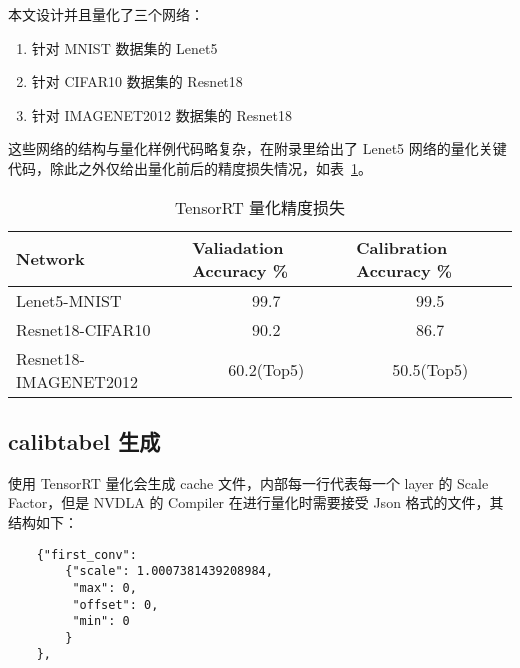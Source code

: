 本文设计并且量化了三个网络：

\begin{enumerate}
    \item 针对 MNIST 数据集的 Lenet5
    \item 针对 CIFAR10 数据集的 Resnet18
    \item 针对 IMAGENET2012 数据集的 Resnet18
\end{enumerate}

这些网络的结构与量化样例代码略复杂，在附录里给出了 Lenet5 网络的量化关键代码，除此之外仅给出量化前后的精度损失情况，如表~\ref{tab:Qualifications Report}。

\begin{table}[!htbp]
    \caption{TensorRT 量化精度损失}
    \label{tab:Qualifications Report}
    \centering
    \footnotesize%
    \setlength{\tabcolsep}{4pt}%
    \renewcommand{\arraystretch}{1.2}%
    \begin{tabular}{lcc}
        \toprule
        \textbf{Network}      & \multicolumn{1}{l}{\textbf{Valiadation Accuracy \%}} & \multicolumn{1}{l}{\textbf{Calibration Accuracy \%}} \\
        \midrule
        Lenet5-MNIST          & 99.7                                                 & 99.5                                                 \\
        Resnet18-CIFAR10      & 90.2                                                 & 86.7                                                 \\
        Resnet18-IMAGENET2012 & 60.2(Top5)                                           & 50.5(Top5)                                           \\
        \bottomrule                   
    \end{tabular}
\end{table}

\subsection{calibtabel 生成}

使用 TensorRT 量化会生成 cache 文件，内部每一行代表每一个 layer 的 Scale Factor，但是 NVDLA 的 Compiler 在进行量化时需要接受 Json 格式的文件，其结构如下：

\begin{lstlisting}
    {"first_conv":
        {"scale": 1.0007381439208984,
         "max": 0,
         "offset": 0,
         "min": 0
        }
    },
\end{lstlisting}

